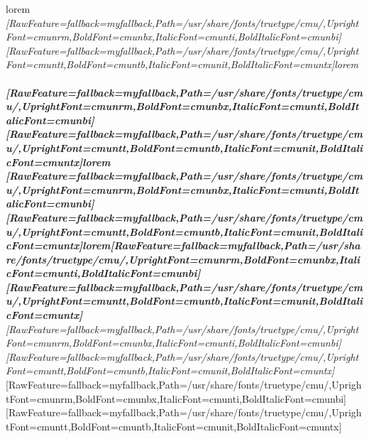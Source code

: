 lorem{\itshape {$\text{ }$}\allowbreak{}\setmainfont{cmunti.ttf}[RawFeature={fallback=myfallback},Path=/usr/share/fonts/truetype/cmu/,UprightFont=cmunrm,BoldFont=cmunbx,ItalicFont=cmunti,BoldItalicFont=cmunbi]\setmonofont{cmunti.ttf}[RawFeature={fallback=myfallback},Path=/usr/share/fonts/truetype/cmu/,UprightFont=cmuntt,BoldFont=cmuntb,ItalicFont=cmunit,BoldItalicFont=cmuntx]\itshape  lorem {\bfseries {$\text{ }$}\allowbreak{}\setmainfont{cmunbi.ttf}[RawFeature={fallback=myfallback},Path=/usr/share/fonts/truetype/cmu/,UprightFont=cmunrm,BoldFont=cmunbx,ItalicFont=cmunti,BoldItalicFont=cmunbi]\setmonofont{cmunbi.ttf}[RawFeature={fallback=myfallback},Path=/usr/share/fonts/truetype/cmu/,UprightFont=cmuntt,BoldFont=cmuntb,ItalicFont=cmunit,BoldItalicFont=cmuntx]\bfseries \itshape  lorem {\ttfamily {$\text{ }$}\allowbreak{}\setmainfont{cmuntx.ttf}[RawFeature={fallback=myfallback},Path=/usr/share/fonts/truetype/cmu/,UprightFont=cmunrm,BoldFont=cmunbx,ItalicFont=cmunti,BoldItalicFont=cmunbi]\setmonofont{cmuntx.ttf}[RawFeature={fallback=myfallback},Path=/usr/share/fonts/truetype/cmu/,UprightFont=cmuntt,BoldFont=cmuntb,ItalicFont=cmunit,BoldItalicFont=cmuntx]\ttfamily \bfseries \itshape  lorem}\allowbreak{}\setmainfont{cmunbi.ttf}[RawFeature={fallback=myfallback},Path=/usr/share/fonts/truetype/cmu/,UprightFont=cmunrm,BoldFont=cmunbx,ItalicFont=cmunti,BoldItalicFont=cmunbi]\setmonofont{cmunbi.ttf}[RawFeature={fallback=myfallback},Path=/usr/share/fonts/truetype/cmu/,UprightFont=cmuntt,BoldFont=cmuntb,ItalicFont=cmunit,BoldItalicFont=cmuntx]\bfseries \itshape}\allowbreak{}\setmainfont{cmunti.ttf}[RawFeature={fallback=myfallback},Path=/usr/share/fonts/truetype/cmu/,UprightFont=cmunrm,BoldFont=cmunbx,ItalicFont=cmunti,BoldItalicFont=cmunbi]\setmonofont{cmunti.ttf}[RawFeature={fallback=myfallback},Path=/usr/share/fonts/truetype/cmu/,UprightFont=cmuntt,BoldFont=cmuntb,ItalicFont=cmunit,BoldItalicFont=cmuntx]\itshape}\allowbreak{}\setmainfont{cmunrm.ttf}[RawFeature={fallback=myfallback},Path=/usr/share/fonts/truetype/cmu/,UprightFont=cmunrm,BoldFont=cmunbx,ItalicFont=cmunti,BoldItalicFont=cmunbi]\setmonofont{cmunrm.ttf}[RawFeature={fallback=myfallback},Path=/usr/share/fonts/truetype/cmu/,UprightFont=cmuntt,BoldFont=cmuntb,ItalicFont=cmunit,BoldItalicFont=cmuntx] 

